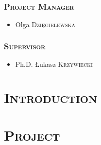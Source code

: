 \documentclass[a4paper,11pt,english]{report}
\newcommand{\noun}[1]{\textsc{#1}}
\begin{document}
 \begin{center}
\section*{\textsc{Project Manager}}

\begin{itemize}
\item[] {\hfil Olga \textsc{Dzięgielewska} }
\end{itemize}

  
 \end{center}

 \begin{center}
\section*{\textsc{Supervisor}}

\begin{itemize}
\item[] {\hfil Ph.D. Łukasz \textsc{Krzywiecki} }
\end{itemize}

  
 \end{center}
  
\tableofcontents



\onehalfspacing



%

\part{\noun{Introduction}}





\part{\noun{Project}}


\end{document}
